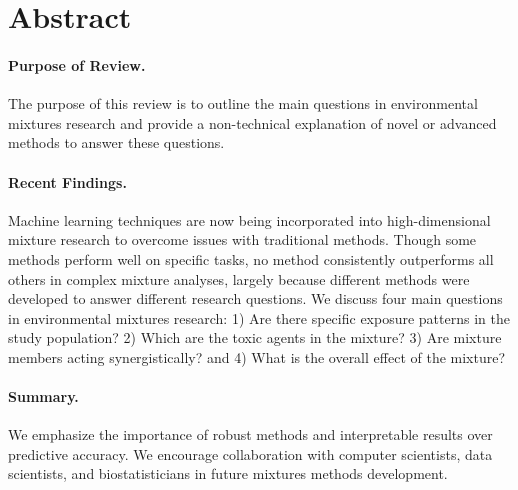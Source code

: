 \thispagestyle{empty}

\section*{Abstract}

\paragraph{Purpose of Review.}

The purpose of this review is to outline the main questions in environmental mixtures research and provide a non-technical explanation of novel or advanced methods to answer these questions.

\paragraph{Recent Findings.} 

Machine learning techniques are now being incorporated into high-dimensional mixture research to overcome issues with traditional methods. Though some methods perform well on specific tasks, no method consistently outperforms all others in complex mixture analyses, largely because different methods were developed to answer different research questions. We discuss four main questions in environmental mixtures research: 1) Are there specific exposure patterns in the study population? 2) Which are the toxic agents in the mixture? 3) Are mixture members acting synergistically? and 4) What is the overall effect of the mixture? 

\paragraph{Summary.} 

We emphasize the importance of robust methods and interpretable results over predictive accuracy. We encourage collaboration with computer scientists, data scientists, and biostatisticians in future mixtures methods development.